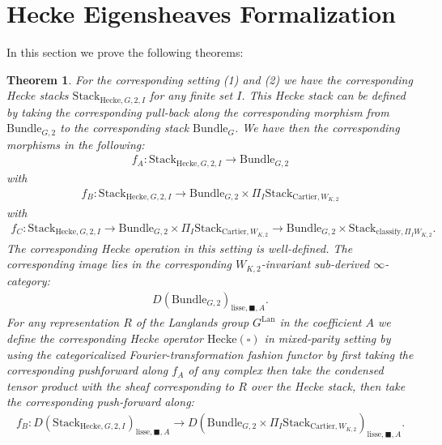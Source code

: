 \documentclass[12pt]{book}
\newtheorem{theorem}{Theorem}
\theoremstyle{definition}
\begin{document}
\newpage
\section{Hecke Eigensheaves Formalization}

\noindent In this section we prove the following theorems:

\begin{theorem}
For the corresponding setting (1) and (2) we have the corresponding Hecke stacks $\mathrm{Stack}_{\mathrm{Hecke},G,2,I}$ for any finite set $I$. This Hecke stack can be defined by taking the corresponding pull-back along the corresponding morphism from $\mathrm{Bundle}_{G,2}$ to the corresponding stack $\mathrm{Bundle}_{G}$. We have then the corresponding morphisms in the following:
\begin{align}
f_A: \mathrm{Stack}_{\mathrm{Hecke},G,2,I} \rightarrow \mathrm{Bundle}_{G,2}
\end{align}
with
\begin{align}
f_B: \mathrm{Stack}_{\mathrm{Hecke},G,2,I} \rightarrow \mathrm{Bundle}_{G,2}\times \Pi_I \mathrm{Stack}_{\mathrm{Cartier},W_{K,2}}
\end{align}
with
\begin{align}
f_C: \mathrm{Stack}_{\mathrm{Hecke},G,2,I} \rightarrow \mathrm{Bundle}_{G,2}\times \Pi_I \mathrm{Stack}_{\mathrm{Cartier},W_{K,2}}\rightarrow \mathrm{Bundle}_{G,2}\times \mathrm{Stack}_{\mathrm{classify},\Pi_I W_{K,2}}.
\end{align}
The corresponding Hecke operation in this setting is well-defined. The corresponding image lies in the corresponding $W_{K,2}$-invariant sub-derived $\infty$-category:
\begin{align}
D(\mathrm{Bundle}_{G,2})_{\text{lisse},\blacksquare,A}.
\end{align}
For any representation $R$ of the Langlands group $G^\mathrm{Lan}$ in the coefficient $A$ we define the corresponding Hecke operator $\mathrm{Hecke}(\square)$ in mixed-parity setting by using the categoricalized Fourier-transformation fashion functor by first taking the corresponding pushforward along $f_A$ of any complex then take the condensed tensor product with the sheaf corresponding to $R$ over the Hecke stack, then take the corresponding push-forward along:
\begin{align}
f_B: D(\mathrm{Stack}_{\mathrm{Hecke},G,2,I})_{\text{lisse},\blacksquare,A} \rightarrow D(\mathrm{Bundle}_{G,2}\times \Pi_I \mathrm{Stack}_{\mathrm{Cartier},W_{K,2}})_{\text{lisse},\blacksquare,A}.

\end{align}
\end{theorem}
\end{document}
